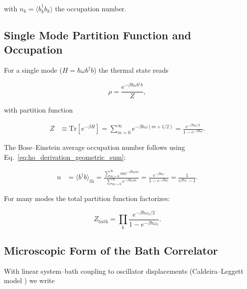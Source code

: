 \noindent
with $n_k = \langle b_k^{\dagger} b_k \rangle$ the occupation number.


\subsection{Single Mode Partition Function and Occupation}
\label{subsec:single_mode}

\noindent
For a single mode ($H=\hbar \omega b^{\dagger} b$) the thermal state reads

\begin{equation} \label{eq:ho_single_mode_density_matrix}
	\rho = \frac{e^{-\beta \hbar \omega b^{\dagger} b}}{Z},
\end{equation}

\noindent
with partition function

\begin{align} \label{eq:ho_partition_function}
	Z & \equiv \mathrm{Tr}[e^{-\beta H}] = \sum_{m=0}^{\infty} e^{-\beta \hbar \omega (m+1/2)} = \frac{e^{-\beta \hbar \omega/2}}{1 - e^{-\beta \hbar \omega}}.
\end{align}

\noindent
The Bose--Einstein average occupation number follows using Eq.~\eqref{eq:ho_derivation_geometric_sum}:

\begin{align} \label{eq:ho_expectation_number_operator}
	n & = \langle b^{\dagger} b \rangle_{\text{th}} = \frac{\sum_{m=0}^{\infty} m e^{-\beta \hbar \omega m}}{\sum_{m=0}^{\infty} e^{-\beta \hbar \omega m}} = \frac{e^{-\beta \hbar \omega}}{1-e^{-\beta \hbar \omega}} = \frac{1}{e^{\beta \hbar \omega}-1}.
\end{align}

\noindent
For many modes the total partition function factorizes:

\begin{equation} \label{eq:ho_generalized_partition_function}
	Z_{\text{bath}} = \prod_k \frac{e^{-\beta \hbar \omega_k /2}}{1 - e^{-\beta \hbar \omega_k}}.
\end{equation}


\subsection{Microscopic Form of the Bath Correlator}
\label{subsec:microscopic_bath_correlator}

\noindent
With linear system--bath coupling to oscillator displacements (Caldeira--Leggett model \cite{hagstrommorrison2011caldeiraleggettmodel}) we write

